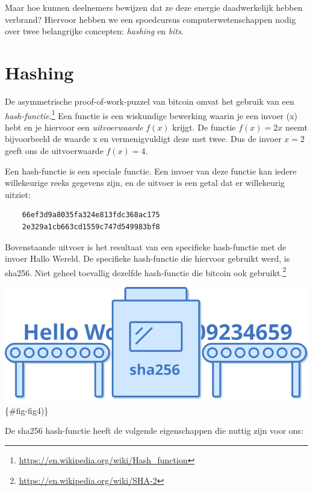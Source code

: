 \documentclass[
  letterpaper,
]{scrbook}
\begin{document}
Maar hoe kunnen deelnemers bewijzen dat ze deze energie daadwerkelijk
hebben verbrand? Hiervoor hebben we een spoedcursus
computerwetenschappen nodig over twee belangrijke concepten:
\emph{hashing} en \emph{bits}.

\hypertarget{hashing}{%
\section{Hashing}\label{hashing}}

De asymmetrische proof-of-work-puzzel van bitcoin omvat het gebruik van
een \emph{hash-functie}.\footnote{\url{https://en.wikipedia.org/wiki/Hash_function}}
Een functie is een wiskundige bewerking waarin je een invoer (x) hebt en
je hiervoor een \emph{uitvoerwaarde} \(f(x)\) krijgt. De functie
\(f(x)=2x\) neemt bijvoorbeeld de waarde x en vermenigvuldigt deze met
twee. Dus de invoer \(x=2\) geeft ons de uitvoerwaarde \(f(x)=4\).

Een hash-functie is een speciale functie. Een invoer van deze functie
kan iedere willekeurige reeks gegevens zijn, en de uitvoer is een getal
dat er willekeurig uitziet:

\begin{verbatim}
    66ef3d9a8035fa324e813fdc368ac175
    2e329a1cb663cd1559c747d549983bf8
\end{verbatim}

Bovenstaande uitvoer is het resultaat van een specifieke hash-functie
met de invoer Hallo Wereld. De specifieke hash-functie die hiervoor
gebruikt werd, is sha256. Niet geheel toevallig dezelfde hash-functie
die bitcoin ook gebruikt.\footnote{\url{https://en.wikipedia.org/wiki/SHA-2}}

\includegraphics{./images/fig4.png}\{\#fig-fig4)\}

De sha256 hash-functie heeft de volgende eigenschappen die nuttig zijn
voor ons:
\end{document}

